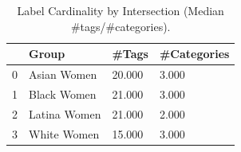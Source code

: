 \begin{table}[htbp]
\centering
\caption{Label Cardinality by Intersection (Median #tags/#categories).}
\label{tab:eda_label_cardinality}
\begin{tabular}{llll}
\toprule
 & Group & \#Tags & \#Categories \\
\midrule
0 & Asian Women & 20.000 & 3.000 \\
1 & Black Women & 21.000 & 3.000 \\
2 & Latina Women & 21.000 & 2.000 \\
3 & White Women & 15.000 & 3.000 \\
\bottomrule
\end{tabular}

\end{table}